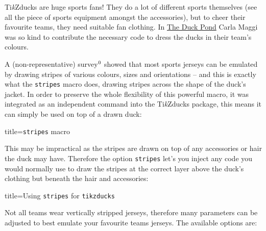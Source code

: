 \documentclass[parskip=half]{scrartcl}
\newcommand{\tikzducks}{Ti\emph{k}Zducks\xspace}
\begin{document}
\tikzducks are huge sports fans! They do a lot of different sports themselves (see all the piece of sports equipment amongst the accessories), but to cheer their favourite teams, they need suitable fan clothing. In \href{https://tex.stackexchange.com/a/387126/36296}{The Duck Pond} Carla Maggi was so kind to contribute the necessary code to dress the ducks in their team's colours.

\addtocounter{footnote}{1}
A (non-representative) survey$^\thefootnote$ showed that most sports jerseys can be emulated by drawing stripes of various colours, sizes and orientations -- and this is exactly what the \lstinline|stripes| macro does, drawing stripes across the shape of the duck's jacket. In order to preserve the whole flexibility of this powerful macro, it was integrated as an independent command into the \tikzducks package, this means it can simply be used on top of a drawn duck:

\begin{tcblisting}{title={\texttt{stripes} macro}}
\begin{tikzpicture}
	\duck
	\stripes
\end{tikzpicture}
\end{tcblisting}

This may be impractical as the stripes are drawn on top of any accessories or hair the duck may have. Therefore the option \lstinline|stripes| let's you inject any code you would normally use to draw the stripes at the correct layer above the duck's clothing but beneath the hair and accessories:

\begin{tcblisting}{title={Using \texttt{stripes} for \texttt{tikzducks}}}
\begin{tikzpicture}
	\duck[longhair,|stripes|={\stripes}]
\end{tikzpicture}
\end{tcblisting}

Not all teams wear vertically stripped jerseys, therefore many parameters can be adjusted to best emulate your favourite teams jerseys. The available options are:
\end{document}
